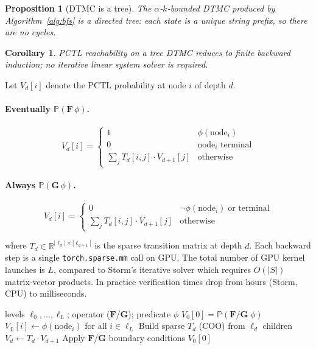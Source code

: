 \documentclass{article}
\newtheorem{proposition}[theorem]{Proposition}
\newtheorem{corollary}[theorem]{Corollary}
\newcommand{\Prob}{\mathbb{P}}
\newcommand{\Real}{\mathbb{R}}
\begin{document}
\begin{proposition}[DTMC is a tree]
The $\alpha$-$k$-bounded DTMC produced by Algorithm~\ref{alg:bfs} is a directed
tree: each state is a unique string prefix, so there are no cycles.
\end{proposition}

\begin{corollary}
PCTL reachability on a tree DTMC reduces to finite backward induction; no
iterative linear system solver is required.
\end{corollary}

Let $V_d[i]$ denote the PCTL probability at node $i$ of depth $d$.

\paragraph{Eventually $\Prob(\mathbf{F}\,\phi)$.}
\begin{equation}
  V_d[i] =
  \begin{cases}
    1 & \phi(\text{node}_i) \\
    0 & \text{node}_i\text{ terminal} \\
    \sum_j T_d[i,j]\cdot V_{d+1}[j] & \text{otherwise}
  \end{cases}
  \label{eq:eventually-recurrence}
\end{equation}

\paragraph{Always $\Prob(\mathbf{G}\,\phi)$.}
\begin{equation}
  V_d[i] =
  \begin{cases}
    0 & \neg\phi(\text{node}_i)\;\text{or terminal} \\
    \sum_j T_d[i,j]\cdot V_{d+1}[j] & \text{otherwise}
  \end{cases}
  \label{eq:always-recurrence}
\end{equation}

where $T_d \in \Real^{|\ell_d| \times |\ell_{d+1}|}$ is the sparse transition
matrix at depth $d$.
Each backward step is a single \texttt{torch.sparse.mm} call on GPU.
The total number of GPU kernel launches is $L$, compared to Storm's iterative
solver which requires $O(|S|)$ matrix-vector products.
In practice verification times drop from hours (Storm, CPU) to milliseconds.

\begin{algorithm}[tb]
\caption{GPU sparse backward induction}
\label{alg:bwd}
\begin{algorithmic}[1]
\Require levels $\ell_0,\ldots,\ell_L$; operator ($\mathbf{F}$/$\mathbf{G}$); predicate $\phi$
\Ensure $V_0[0] = \Prob(\mathbf{F}/\mathbf{G}\;\phi)$
\State $V_L[i] \gets \phi(\text{node}_i)$ for all $i \in \ell_L$
  \State Build sparse $T_d$ (COO) from $\ell_d$ children
  \State $V_d \gets T_d \cdot V_{d+1}$ 
  \State Apply $\mathbf{F}$/$\mathbf{G}$ boundary conditions
\EndFor
\Return $V_0[0]$
\end{algorithmic}
\end{algorithm}
\end{document}
